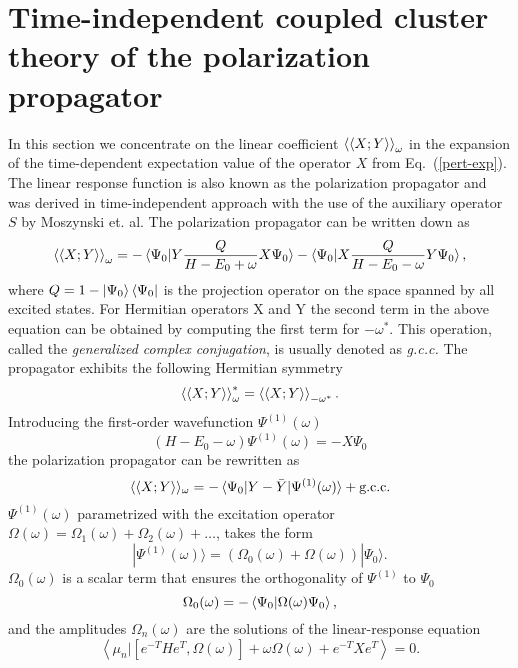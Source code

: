 \documentclass[preprint,12pt]{elsarticle}
\newcommand{\bb}[2]{\braket{ #1|#2}}
\newcommand{\cm}[2]{ [ #1,#2]}
\newcommand{\equ}[1]{\begin{equation} #1 \end{equation}}
\newcommand{\equl}[2]{\begin{equation}\label{#2} #1 \end{equation}}
\newcommand{\fr}[1]{Eq.~(\ref{#1})}
\newcommand{\odp}{\braket{\braket{X;Y}}_\omega}
\begin{document}
\section{Time-independent coupled cluster theory of the polarization propagator}\label{tpp}
In this section we  concentrate on the linear coefficient $\odp$ in the expansion of the time-dependent 
 expectation value of the operator $X$ from \fr{pert-exp}.
The linear response function is also known as the 
polarization propagator and was derived in  time-independent approach with the use of the auxiliary operator $S$
by Moszynski et. al.\cite{moszynski2005time}
The polarization propagator can be written down as\cite{oddershede1978polarization}
\equl{\odp = -\braket{\Psi_0|Y\frac{Q}{H - E_0 +\omega}X\Psi_0}
-\braket{\Psi_0|X\frac{Q}{H - E_0-\omega}Y \Psi_0},
}{1ord}
where $Q=1-\ket{\Psi_0}\bra{\Psi_0}$ is the projection operator on the space spanned by all excited states.
For Hermitian operators X and Y the second term in the above equation can be obtained by computing the first term for $-\omega^*$. This operation,
called the \textit{generalized complex conjugation}, 
is usually denoted as  \textit{g.c.c.} The propagator exhibits the following Hermitian symmetry
\equl{\braket{\braket{X;Y}}_\omega^*=\braket{\braket{X;Y}}_{-\omega^*}.}{tr}
Introducing the first-order wavefunction $\Psi^{(1)}(\omega)$
\equ{(H - E_0-\omega)\Psi^{(1)}(\omega)=-X\Psi_0
  }
the polarization propagator can be rewritten as
\equl{
\langle\langle X;Y\rangle\rangle _\omega = -\braket{\Psi_0|Y-\bar{Y}|\Psi^{(1)}(\omega)}+ \text{g.c.c.}
}{1ord}
$\Psi^{(1)}(\omega)$  parametrized with the excitation operator   $\Omega(\omega)= \Omega_1(\omega) + \Omega_2(\omega) + \ldots$, takes the form
\equl{|\Psi^{(1)}(\omega)\rangle =  (\Omega_0(\omega) + \Omega(\omega)) |\Psi_0\rangle.
}{psi1}
$\Omega_0(\omega)$ is a scalar term that ensures the orthogonality of $\Psi^{(1)}$ to $\Psi_0$\cite{moszynski2005time, korona2006time}
\equ{\Omega_0(\omega) = - \bb{\Psi_0}{\Omega(\omega)\Psi_0},}
and the amplitudes $\Omega_n(\omega)$   are the solutions of  the linear-response equation
\cite{moszynski2005time, korona2006time} 
\equl{
\left \langle \mu_n |\cm{e^{-T} H e^T}{ \Omega(\omega)} + \omega\Omega(\omega)
  + e^{-T}Xe^T\right \rangle = 0.
}{om}
\end{document}
